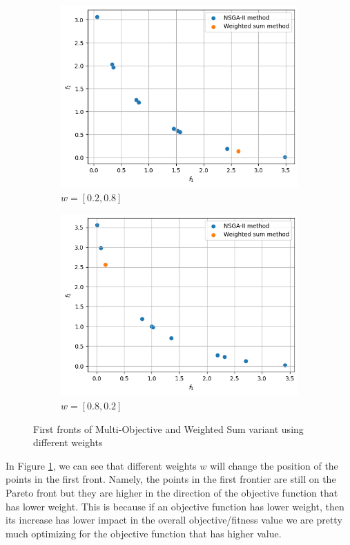 \begin{figure}[ht]
    \begin{subfigure}{0.32\textwidth}
        \includegraphics[width=\textwidth]{images/p3-w02_08.png}
        \caption{\(w = [0.2, 0.8]\)}
    \end{subfigure}
    \hfill
    \begin{subfigure}{0.32\textwidth}
        \includegraphics[width=\textwidth]{images/p3-w08_02.png}
        \caption{\(w = [0.8, 0.2]\)}
    \end{subfigure}

    \caption{First fronts of Multi-Objective and Weighted Sum variant using different weights}
    \label{fig:diff-weight}
\end{figure}

In Figure \ref{fig:diff-weight}, we can see that different weights \(w\) will change the position of the points in the first front. Namely, the points in the first frontier are still on the Pareto front but they are higher in the direction of the objective function that has lower weight. This is because if an objective function has lower weight, then its increase has lower impact in the overall objective/fitness value we are pretty much optimizing for the objective function that has higher value.
